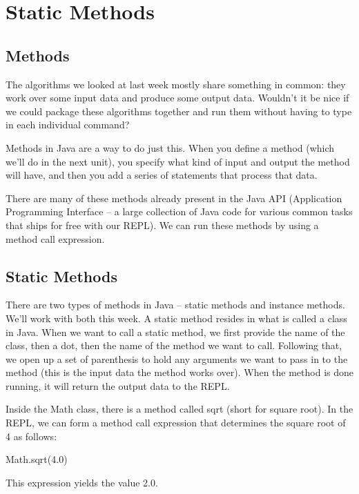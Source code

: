 \section{Static Methods}

\subsection{Methods}
The algorithms we looked at last week mostly share something in common: they work over some input data and produce some output data. Wouldn't it be nice if we could package these algorithms together and run them without having to type in each individual command? 

Methods in Java are a way to do just this. When you define a method (which we'll do in the next unit), you specify what kind of input and output the method will have, and then you add a series of statements that process that data. 

There are many of these methods already present in the Java API (Application Programming Interface -- a large collection of Java code for various common tasks that ships for free with our REPL). We can run these methods by using a method call expression. 

\subsection{Static Methods}

There are two types of methods in Java -- static methods and instance methods. We'll work with both this week. A static method resides in what is called a class in Java. When we want to call a static method, we first provide the name of the class, then a dot, then the name of the method we want to call. Following that, we open up a set of parenthesis to hold any arguments we want to pass in to the method (this is the input data the method works over). When the method is done running, it will return the output data to the REPL. 

\begin{exa}
Inside the Math class, there is a method called sqrt (short for square root). In the REPL, we can form a method call expression that determines the square root of 4 as follows:

\begin{code}
Math.sqrt(4.0)
\end{code}

This expression yields the value 2.0.

\end{exa}

